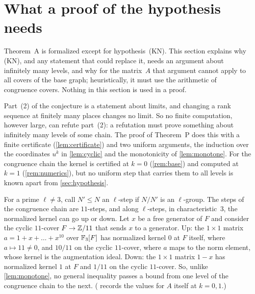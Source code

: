 \section{What a proof of the hypothesis needs}\label{sec:limits}

Theorem~A is formalized except for hypothesis~(KN). This section explains why (KN), and any statement that could replace it, needs an argument about
infinitely many levels, and why for the matrix~$A$ that argument cannot apply to all covers of the base graph;
heuristically, it must use the arithmetic of congruence covers. Nothing in this section is used in a proof.

\begin{remark}\label{rem:finite}
Part~(2) of the conjecture is a statement about limits, and changing a rank sequence at finitely many places changes no
limit. So no finite computation, however large, can refute part~(2): a refutation must prove something about infinitely
many levels of some chain. The proof of Theorem~P does this with a finite certificate (\cref{lem:certificate}) and two
uniform arguments, the induction over the coordinates $u^k$ in \cref{lem:cyclic} and the monotonicity of
\cref{lem:monotone}. For the congruence chain the kernel is certified at $k=0$ (\cref{rem:base}) and computed at $k=1$
(\cref{rem:numerics}), but no uniform step that carries them to all levels is known apart from \cref{sec:hypothesis}.
\end{remark}

\begin{remark}\label{rem:ellsteps}
For a prime $\ell\ne3$, call $N'\le N$ an $\ell$-step if $N/N'$ is an $\ell$-group. The steps of the congruence chain are
$11$-steps, and along $\ell$-steps, in characteristic~$3$, the normalized kernel can go up or down. Let $x$ be a free
generator of $F$ and consider the cyclic $11$-cover $F\to\mathbb{Z}/11$ that sends $x$ to a generator. Up: the $1\times1$ matrix
$a=1+x+\dots+x^{10}$ over $\mathbb{F}_3[F]$ has normalized kernel $0$ at $F$ itself, where $a\mapsto11\ne0$, and $10/11$ on the
cyclic $11$-cover, where $a$ maps to the norm element, whose kernel is the augmentation ideal. Down: the $1\times1$ matrix
$1-x$ has normalized kernel $1$ at $F$ and $1/11$ on the cyclic $11$-cover. So, unlike \cref{lem:monotone}, no general
inequality passes a bound from one level of the congruence chain to the next. ( records the values for
$A$ itself at $k=0,1$.)
\end{remark}

